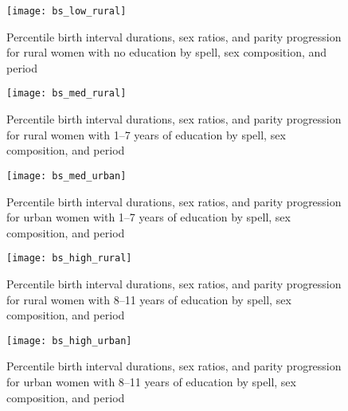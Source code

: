 \documentclass[12pt,letterpaper]{article}
\begin{document}
\captionsetup[figure]{skip = -16pt}

\begin{figure}
\centering
\texttt{[image: bs\_low\_rural]}
\caption{Percentile birth interval durations, sex ratios, and parity progression  
for rural women with no education by spell, sex composition, and period}
\label{fig:spacing_low_rural}
\end{figure}


\begin{figure}
\centering
\texttt{[image: bs\_med\_rural]}
\caption{Percentile birth interval durations, sex ratios, and parity progression  
for rural women with 1--7 years of education by spell, sex composition, and period}
\label{fig:spacing_med_rural}
\end{figure}

\begin{figure}
\centering
\texttt{[image: bs\_med\_urban]}
\caption{Percentile birth interval durations, sex ratios, and parity progression  
for urban women with 1--7 years of education by spell, sex composition, and period}
\label{fig:spacing_med_urban}
\end{figure}

\begin{figure}
\centering
\texttt{[image: bs\_high\_rural]}
\caption{Percentile birth interval durations, sex ratios, and parity progression  
for rural women with 8--11 years of education by spell, sex composition, and period}
\label{fig:spacing_high_rural}
\end{figure}

\begin{figure}
\centering
\texttt{[image: bs\_high\_urban]}
\caption{Percentile birth interval durations, sex ratios, and parity progression  
for urban women with 8--11 years of education by spell, sex composition, and period}
\label{fig:spacing_high_urban}
\end{figure}
\end{document}
